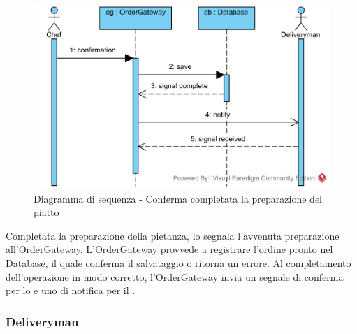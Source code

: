 \begin{figure}[H]
	\centering
	\includegraphics[width=14cm]{diagrammi_img/sequenza/cuoco_piatto_pronto.png}
	\caption{Diagramma di sequenza - Conferma completata la preparazione del piatto}
\end{figure}
Completata la preparazione della pietanza, lo \Chef{} segnala l'avvenuta preparazione all'Order\-Gateway. L'Order\-Gateway provvede a registrare l'ordine pronto nel Database, il quale conferma il salvataggio o ritorna un errore. Al completamento dell'operazione in modo corretto, l'Order\-Gateway invia un segnale di conferma per lo \Chef{} e uno di notifica per il \Deliveryman{}.

\subsubsection{Deliveryman}


